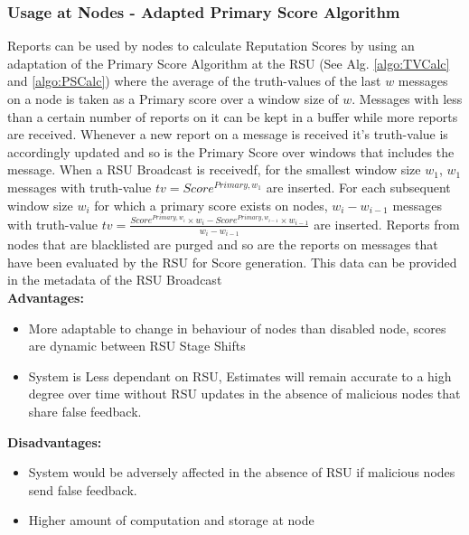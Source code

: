 \documentclass[journal]{IEEEtran}
\begin{document}
\subsubsection{Usage at Nodes - Adapted Primary Score Algorithm}
Reports can be used by nodes to calculate Reputation Scores by using an adaptation of the Primary Score Algorithm at the RSU (See Alg. \ref{algo:TVCalc} and \ref{algo:PSCalc}) where the average of the truth-values of the last $ w $ messages on a node is taken as a Primary score over a window size of $ w $. Messages with less than a certain number of reports on it can be kept in a buffer while more reports are received. Whenever a new report on a message is received it's truth-value is accordingly updated and so is the Primary Score over windows that includes the message. When a RSU Broadcast is receivedf, for the smallest window size $ w_1 $, $ w_1 $ messages with truth-value $ tv = Score^{Primary,w_1} $ are inserted. For each subsequent window size $ w_i $ for which a primary score exists on nodes, $ w_i - w_{i-1} $ messages with truth-value $ tv = \frac{Score^{Primary,w_i}\times w_i - Score^{Primary,w_{i-1}}\times w_{i-1}}{w_i - w_{i-1}} $ are inserted. Reports from nodes that are blacklisted are purged and so are the reports on messages that have been evaluated by the RSU for Score generation. This data can be provided in the metadata of the RSU Broadcast\\
\textbf{Advantages:}
\begin{itemize}
	\item More adaptable to change in behaviour of nodes than disabled node, scores are dynamic between RSU Stage Shifts
	\item System is Less dependant on RSU, Estimates will remain accurate to a high degree over time without RSU updates in the absence of malicious nodes that share false feedback.
\end{itemize}
\textbf{Disadvantages:} 
\begin{itemize}
	\item System would be adversely affected in the absence of RSU if malicious nodes send false feedback.
	\item Higher amount of computation and storage at node
\end{itemize}
\end{document}
